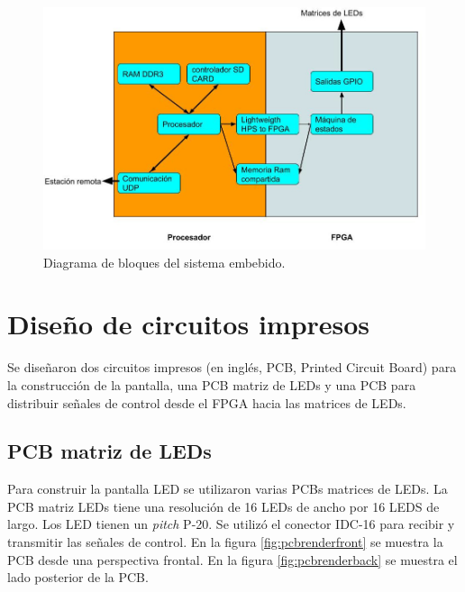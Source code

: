 \begin{figure}[htpb]
	\centering
	\includegraphics[scale=2]{Figures/Diagramabloques.jpg} 
	\caption{Diagrama de bloques del sistema embebido.}
	\label{fig:bloques embebido}
\end{figure}






\section{ Diseño de circuitos impresos}
Se diseñaron dos circuitos impresos (en inglés, PCB, Printed Circuit Board) para la construcción de la pantalla, una PCB matriz de LEDs y una PCB para distribuir señales de control desde el FPGA hacia las matrices de LEDs.
\subsection{PCB matriz de LEDs}
Para construir la pantalla LED se utilizaron varias PCBs matrices de LEDs. La PCB matriz LEDs tiene una resolución de 16 LEDs de ancho por 16 LEDS de largo. Los LED tienen un \textit{pitch} P-20. Se utilizó el conector IDC-16 para recibir y transmitir las señales de control. En la figura \ref{fig:pcbrenderfront}  se muestra la PCB desde una perspectiva frontal. En la figura \ref{fig:pcbrenderback} se muestra el lado posterior de la PCB.


